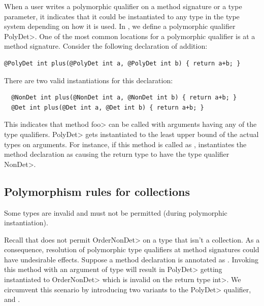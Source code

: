 When a user writes a polymorphic qualifier on a method signature or a type parameter,
it indicates that it could be instantiated
to any type in the type system depending on how it is used.
In \theDeterminismChecker, we define a polymorphic qualifier \<PolyDet>.
One of the most common locations for a polymorphic qualifier is at a method signature.
Consider the following declaration of addition:
\begin{verbatim}
@PolyDet int plus(@PolyDet int a, @PolyDet int b) { return a+b; }
\end{verbatim}
There are two valid instantiations for this declaration:
\begin{Verbatim}
  @NonDet int plus(@NonDet int a, @NonDet int b) { return a+b; }
  @Det int plus(@Det int a, @Det int b) { return a+b; }
\end{Verbatim}
This indicates that method \<foo> can be called with arguments having any of the  type qualifiers.
 \<PolyDet> gets instantiated to the least upper bound of
the actual types on arguments. For instance, if this method is called as , \theDeterminismChecker instantiates the method declaration as 
causing the return type to have the type qualifier \<NonDet>.

\subsection{Polymorphism rules for collections}\label{polymorphism-up-down}

Some types are invalid and must not be permitted (during polymorphic instantiation).

Recall that \theDeterminismChecker does not permit \<OrderNonDet> on a type
that isn't a collection.
As a consequence, resolution of polymorphic type qualifiers at method signatures could have undesirable effects.
Suppose a method declaration is annotated as . Invoking this method
with an argument of type  will result in \<PolyDet> getting instantiated to \<OrderNonDet> which is invalid
on the return type \<int>. We circumvent this scenario by introducing two variants to the \<PolyDet> qualifier, \PolyDetUp
and \PolyDetDown. 


